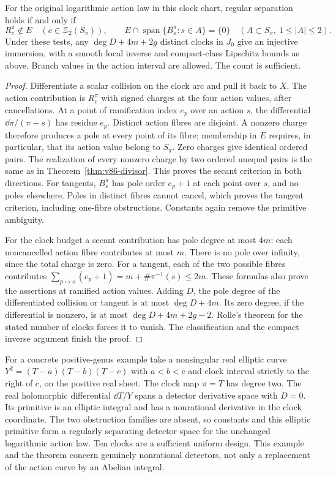 \begin{theorem}
\label{thm:v86-branched}
For the original logarithmic action law in this clock chart, regular
separation holds if and only if
\[
 R_c^\pi\notin E\quad(c\in\mathcal Z_2(S_\pi)),\qquad
 E\cap\operatorname{span}\{B_s^\pi:s\in A\}=\{0\}
                    \quad(A\subset S_\pi,\ 1\le|A|\le2).
\]
Under these tests, any $\deg D+4m+2g$ distinct clocks in $J_0$ give
an injective immersion, with a smooth local inverse and compact-class
Lipschitz bounds as above. Branch values in the action interval are
allowed. The count is sufficient.
\end{theorem}
\begin{proof}
Differentiate a scalar collision on the clock arc and pull it back to
$X$. The action contribution is $R_c^\pi$ with signed charges at the
four action values, after cancellations. At a point of ramification
index $e_p$ over an action $s$, the differential
$\dd\pi/(\pi-s)$ has residue $e_p$. Distinct action fibres are
disjoint. A nonzero charge therefore produces a pole at every point
of its fibre; membership in $E$ requires, in particular, that its action
value belong to $S_\pi$. Zero charges give identical ordered pairs.
The realization of every nonzero charge by two ordered unequal pairs
is the same as in Theorem~\ref{thm:v86-divisor}. This proves the
secant criterion in both directions. For tangents,
$B_s^\pi$ has pole order $e_p+1$ at each point over $s$, and no poles
elsewhere. Poles in distinct fibres cannot cancel, which proves the
tangent criterion, including one-fibre obstructions. Constants again
remove the primitive ambiguity.

For the clock budget a secant contribution has pole degree at most
$4m$: each noncancelled action fibre contributes at most $m$.
There is no pole over infinity, since the total charge is zero.
For a tangent, each of the two possible fibres contributes
$\sum_{p\mapsto s}(e_p+1)=m+\#\pi^{-1}(s)\le2m$.
These formulas also prove the assertions at ramified action values.
Adding $D$, the pole degree of the differentiated collision or tangent
is at most $\deg D+4m$. Its zero degree, if the differential is
nonzero, is at most $\deg D+4m+2g-2$. Rolle's theorem for the stated
number of clocks forces it to vanish. The classification and the
compact inverse argument finish the proof.
\end{proof}
For a concrete positive-genus example take a nonsingular real elliptic
curve $Y^2=(T-a)(T-b)(T-c)$ with $a<b<c$ and clock interval strictly
to the right of $c$, on the positive real sheet. The clock map $\pi=T$
has degree two. The real holomorphic differential $\dd T/Y$ spans a
detector derivative space with $D=0$. Its primitive is an elliptic
integral and has a nonrational derivative in the clock coordinate.
The two obstruction families are absent, so constants and this elliptic
primitive form a regularly separating detector space for the unchanged
logarithmic action law. Ten clocks are a sufficient uniform design.
This example and the theorem concern genuinely nonrational detectors,
not only a replacement of the action curve by an Abelian integral.

